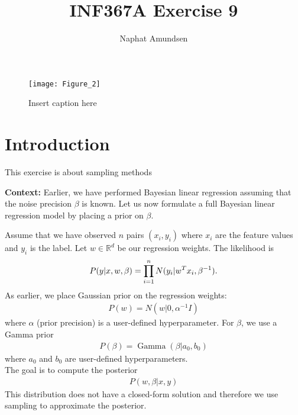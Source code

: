 \documentclass[12pt]{article}
\begin{document}
\title{\textbf{INF367A Exercise 9}}
\author{Naphat Amundsen}
\maketitle
\sectionfont{\fontsize{14}{15}\selectfont}
\subsectionfont{\fontsize{12}{15}\selectfont}
\subsubsectionfont{\fontsize{12}{15}\selectfont}
\graphicspath{ {./images/} }

\ifx
\begin{figure}[H]
	\centering
	\texttt{[image: Figure\_2]}
	\caption{Insert caption here}
\end{figure}
\fi

\section*{Introduction}
    This exercise is about sampling methods
    \vspace{5mm}
    \begin{tcolorbox}[breakable]
        \textbf{Context:} Earlier, we have performed Bayesian linear regression assuming that the noise precision $\beta$ is known. Let us now formulate a full Bayesian linear regression model by placing a prior on $\beta$. 

        Assume that we have observed $n$ pairs $(x_i, y_i)$ where $x_i$ are the feature values and $y_i$ is the label. Let $w \in \mathbb{R}^d$ be our regression weights. The likelihood is 
        \begin{align*}
            P(y|x,w,\beta) = \prod\limits_{i=1}^{n}N(y_i|w^Tx_i, \beta^{-1}).
        \end{align*}
        As earlier, we place Gaussian prior on the regression weights:
        \begin{align*}
            P(w) = N(w|0, \alpha^{-1}I)
        \end{align*}
        where $\alpha$ (prior precision) is a user-defined hyperparameter. For $\beta$, we use a Gamma prior 
        \begin{align*}
            P(\beta) = \operatorname{Gamma}(\beta|a_0, b_0)
        \end{align*}
        where $a_0$ and $b_0$ are user-defined hyperparameters. \\ 

        The goal is to compute the posterior
        \begin{align*}
            P(w,\beta|x,y)
        \end{align*}
        This distribution does not have a closed-form solution and therefore we use sampling to approximate the posterior. 
    \end{tcolorbox}
\end{document}
